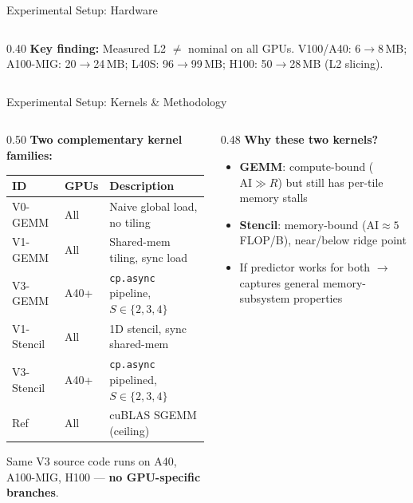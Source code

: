 \documentclass[aspectratio=169,10pt]{beamer}
\begin{document}
\begin{frame}{Experimental Setup: Hardware}
\begin{columns}[T]
\begin{column}{0.40\textwidth}
\vspace{0.3em}
\scriptsize
\textbf{Key finding:} Measured L2 $\neq$ nominal on all GPUs. V100/A40: 6$\to$8\,MB; A100-MIG: 20$\to$24\,MB; L40S: 96$\to$99\,MB; H100: 50$\to$28\,MB (L2 slicing).
\end{column}
\end{columns}
\end{frame}

\begin{frame}{Experimental Setup: Kernels \& Methodology}

\begin{columns}[T]
\begin{column}{0.50\textwidth}
\textbf{Two complementary kernel families:}

\vspace{0.3em}
\renewcommand{\arraystretch}{1.2}
\begin{table}
\centering
\scriptsize
\begin{tabular}{@{}llp{3.5cm}@{}}
\toprule
\textbf{ID} & \textbf{GPUs} & \textbf{Description} \\
\midrule
V0-GEMM & All & Naive global load, no tiling \\
V1-GEMM & All & Shared-mem tiling, sync load \\
V3-GEMM & A40+ & \texttt{cp.async} pipeline, $S \in \{2,3,4\}$ \\
\midrule
V1-Stencil & All & 1D stencil, sync shared-mem \\
V3-Stencil & A40+ & \texttt{cp.async} pipelined, $S \in \{2,3,4\}$ \\
\midrule
Ref & All & cuBLAS SGEMM (ceiling) \\
\bottomrule
\end{tabular}
\end{table}

\vspace{0.3em}
\scriptsize
Same V3 source code runs on A40, A100-MIG, H100 --- \textbf{no GPU-specific branches}.
\end{column}

\begin{column}{0.48\textwidth}
\textbf{Why these two kernels?}
\begin{itemize}\scriptsize
    \item \textbf{GEMM}: compute-bound ($\text{AI} \gg R$) but still has per-tile memory stalls
    \item \textbf{Stencil}: memory-bound ($\text{AI} \approx 5$ FLOP/B), near/below ridge point
    \item If predictor works for both $\to$ captures general memory-subsystem properties
\end{itemize}


\end{column}
\end{columns}
\end{frame}
\end{document}
